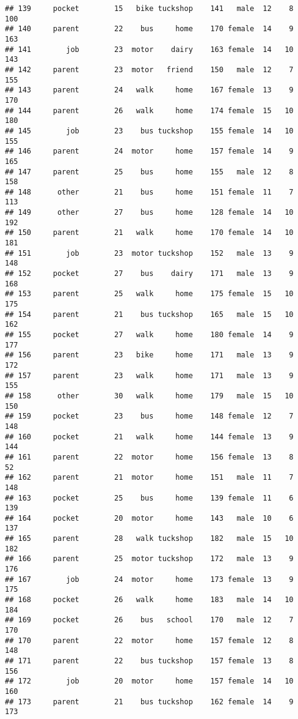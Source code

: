 \documentclass[
]{article}
\begin{document}
\begin{verbatim}
## 139     pocket        15   bike tuckshop    141   male  12    8     100
## 140     parent        22    bus     home    170 female  14    9     163
## 141        job        23  motor    dairy    163 female  14   10     143
## 142     parent        23  motor   friend    150   male  12    7     155
## 143     parent        24   walk     home    167 female  13    9     170
## 144     parent        26   walk     home    174 female  15   10     180
## 145        job        23    bus tuckshop    155 female  14   10     155
## 146     parent        24  motor     home    157 female  14    9     165
## 147     parent        25    bus     home    155   male  12    8     158
## 148      other        21    bus     home    151 female  11    7     113
## 149      other        27    bus     home    128 female  14   10     192
## 150     parent        21   walk     home    170 female  14   10     181
## 151        job        23  motor tuckshop    152   male  13    9     148
## 152     pocket        27    bus    dairy    171   male  13    9     168
## 153     parent        25   walk     home    175 female  15   10     175
## 154     parent        21    bus tuckshop    165   male  15   10     162
## 155     pocket        27   walk     home    180 female  14    9     177
## 156     parent        23   bike     home    171   male  13    9     172
## 157     parent        23   walk     home    171   male  13    9     155
## 158      other        30   walk     home    179   male  15   10     150
## 159     pocket        23    bus     home    148 female  12    7     148
## 160     pocket        21   walk     home    144 female  13    9     144
## 161     parent        22  motor     home    156 female  13    8      52
## 162     parent        21  motor     home    151   male  11    7     148
## 163     pocket        25    bus     home    139 female  11    6     139
## 164     pocket        20  motor     home    143   male  10    6     137
## 165     parent        28   walk tuckshop    182   male  15   10     182
## 166     parent        25  motor tuckshop    172   male  13    9     176
## 167        job        24  motor     home    173 female  13    9     175
## 168     pocket        26   walk     home    183   male  14   10     184
## 169     pocket        26    bus   school    170   male  12    7     170
## 170     parent        22  motor     home    157 female  12    8     148
## 171     parent        22    bus tuckshop    157 female  13    8     156
## 172        job        20  motor     home    157 female  14   10     160
## 173     parent        21    bus tuckshop    162 female  14    9     173

\end{verbatim}
\end{document}
